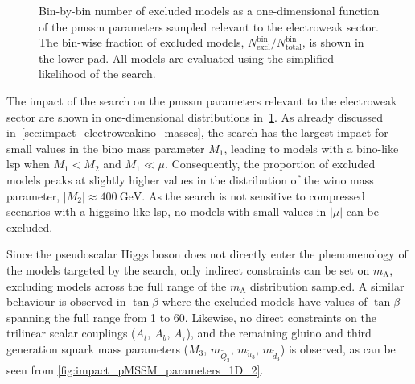 \begin{figure}
\begin{subfigure}[b]{0.5\linewidth}
	\end{subfigure}\hfill
	\caption{Bin-by-bin number of excluded models as a one-dimensional function of the \gls{pmssm} parameters sampled relevant to the electroweak sector. The bin-wise fraction of excluded models, $N^\mathrm{bin}_\mathrm{excl} / N^\mathrm{bin}_\mathrm{total}$, is shown in the lower pad. All models are evaluated using the simplified likelihood of the \onelepton search.}
	\label{fig:impact_pMSSM_parameters_1D}
\end{figure}

The impact of the \onelepton search on the \gls{pmssm} parameters relevant to the electroweak sector are shown in one-dimensional distributions in~\cref{fig:impact_pMSSM_parameters_1D}. As already discussed in~\cref{sec:impact_electroweakino_masses}, the \onelepton search has the largest impact for small values in the bino mass parameter $M_1$, leading to models with a bino-like \gls{lsp} when $M_1 < M_2$ and $M_1 \ll \mu$.
Consequently, the proportion of excluded models peaks at slightly higher values in the distribution of the wino mass parameter, $\vert M_2\vert\approx\SI{400}{\GeV}$. As the search is not sensitive to compressed scenarios with a higgsino-like \gls{lsp}, no models with small values in $\vert\mu\vert$ can be excluded. 

Since the pseudoscalar Higgs boson does not directly enter the phenomenology of the models targeted by the \onelepton search, only indirect constraints can be set on $m_\mathrm{A}$, excluding models across the full range of the $m_\mathrm{A}$ distribution sampled.
A similar behaviour is observed in $\tan\beta$ where the excluded models have values of $\tan\beta$ spanning the full range from 1 to 60.
Likewise, no direct constraints on the trilinear scalar couplings ($A_t$, $A_b$, $A_\tau$), and the remaining gluino and third generation squark mass parameters ($M_3$, $m_{\tilde{Q}_3}$, $m_{\tilde{u}_3}$, $m_{\tilde{d}_3}$) is observed, as can be seen from \cref{fig:impact_pMSSM_parameters_1D_2}. 



